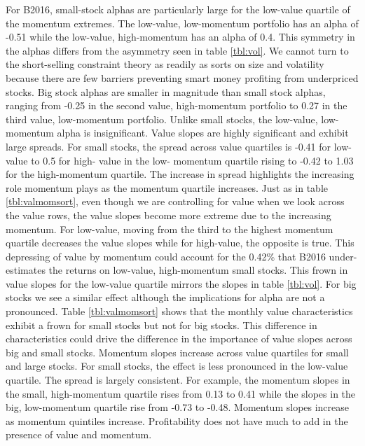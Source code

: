 For B2016, small-stock alphas are particularly large for the low-value quartile of the
momentum extremes. The low-value, low-momentum portfolio has an alpha of -0.51 while the
low-value, high-momentum has an alpha of 0.4. This symmetry in the alphas differs from the
asymmetry seen in table \ref{tbl:vol}. We cannot turn to the short-selling constraint
theory as readily as sorts on size and volatility because there are few barriers
preventing smart money profiting from underpriced stocks. Big stock alphas are smaller in
magnitude than small stock alphas, ranging from -0.25 in the second value, high-momentum
portfolio to 0.27 in the third value, low-momentum portfolio. Unlike small stocks, the
low-value, low- momentum alpha is insignificant. Value slopes are highly significant and
exhibit large spreads. For small stocks, the spread across value quartiles is -0.41 for
low-value to 0.5 for high- value in the low- momentum quartile rising to -0.42 to 1.03 for
the high-momentum quartile. The increase in spread highlights the increasing role momentum
plays as the momentum quartile increases. Just as in table \ref{tbl:valmomsort}, even
though we are controlling for value when we look across the value rows, the value slopes
become more extreme due to the increasing momentum. For low-value, moving from the third
to the highest momentum quartile decreases the value slopes while for high-value, the
opposite is true. This depressing of value by momentum could account for the 0.42\% that
B2016 under- estimates the returns on low-value, high-momentum small stocks. This frown in
value slopes for the low-value quartile mirrors the slopes in table \ref{tbl:vol}. For big
stocks we see a similar effect although the implications for alpha are not a pronounced.
Table \ref{tbl:valmomsort} shows that the monthly value characteristics exhibit a frown
for small stocks but not for big stocks. This difference in characteristics could drive
the difference in the importance of value slopes across big and small stocks. Momentum
slopes increase across value quartiles for small and large stocks. For small stocks, the
effect is less pronounced in the low-value quartile. The spread is largely consistent. For
example, the momentum slopes in the small, high-momentum quartile rises from 0.13 to 0.41
while the slopes in the big, low-momentum quartile rise from -0.73 to -0.48. Momentum
slopes increase as momentum quintiles increase. Profitability does not have much to add in
the presence of value and momentum.

